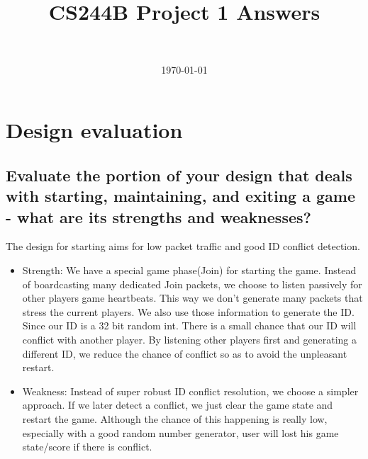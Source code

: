 \documentclass[11pt]{article} %
\author{\myname \\
		\texttt{\myemail}
}
\begin{document}
\title{CS244B Project 1 Answers}
\date{\today}
\maketitle

\section{Design evaluation}

\subsection{Evaluate the portion of your design that deals with starting, 
maintaining, and exiting a game - what are its strengths and weaknesses?}

The design for starting aims for low packet traffic and good ID conflict 
detection.
\begin{itemize}
    \item Strength: We have a special game phase(Join) for starting the game.
        Instead of boardcasting many dedicated Join packets, we choose to listen
        passively for other players game heartbeats. This way we don't generate
        many packets that stress the current players. We also use those information
        to generate the ID. Since our ID is a 32 bit random int. There is a small chance
        that our ID will conflict with another player. By listening other players
        first and generating a different ID, we reduce the chance of conflict so as to 
        avoid the unpleasant restart.
    
    \item Weakness: Instead of super robust ID conflict resolution, we choose a
        simpler approach. If we later detect a conflict, we just clear the game state
        and restart the game. Although the chance of this happening is really low,
        especially with a good random number generator, user will lost his game
        state/score if there is conflict.
\end{itemize}
\end{document}
